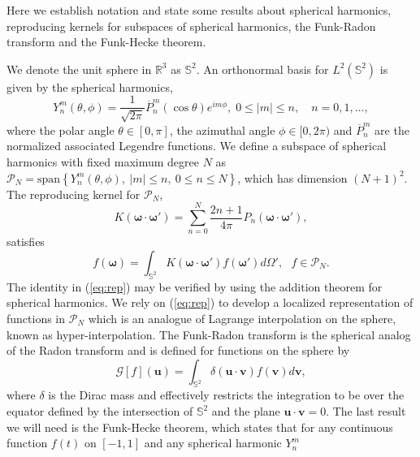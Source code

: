 \documentclass[landscape,a0b,final]{a0poster}
\newcommand{\HH}{{\mathcal P}}
\newcommand{\bomega}{{\boldsymbol{\omega}}}
\newcommand{\odotop}{{\boldsymbol{\omega}\cdot\boldsymbol{\omega}'}}
\newenvironment{poster}{
  \begin{center}
  \begin{minipage}[c]{0.98\textwidth}
}{
  \end{minipage} 
  \end{center}
}
\begin{document}
\begin{poster}
\begin{multicols}{3}
Here we establish notation and state some results about spherical harmonics, reproducing kernels for subspaces of spherical harmonics, the Funk-Radon transform and the Funk-Hecke theorem.

We denote the unit sphere in $\mathbb{R}^{3}$ as $\mathbb{S}^{2}$. An orthonormal basis for $L^{2}\left(\mathbb{S}^{2}\right)$ is given by the spherical harmonics, 
\begin{equation}
  Y_{n}^{m}\left(\theta,\phi\right)=\frac{1}{\sqrt{2\pi}}\overline{P}_{n}^{m}\left(\cos\theta\right)e^{im\phi},\;0\le|m|\le n,\quad n=0,1,\dots,
  \label{eq:ylm}
\end{equation}
%
where the polar angle $\theta\in[0,\pi]$, the azimuthal angle $\phi\in[0,2\pi)$
and $\overline{P}_{n}^{m}$ are the normalized associated Legendre functions. We define a subspace of spherical harmonics with fixed maximum degree $N$ as $\HH_{N}=\mathrm{span}\left\{ Y_{n}^{m}\left(\theta,\phi\right),\:|m|\le n,\:0\le n\le N\right\}$, which has dimension $\left(N+1\right)^{2}$. The reproducing kernel for $\HH_{N}$, 
%
\begin{equation}
  K\left(\bomega\cdot\bomega'\right) = \sum_{n=0}^{N}\frac{2n+1}{4\pi}P_{n}\left(\odotop\right),
  \label{eq:kernel}
\end{equation}
%
satisfies 
%
\begin{equation}
  f\left(\bomega\right)=\int_{\mathbb{S}^{2}}K\left(\odotop\right)f\left(\bomega'\right)d\Omega',\,\,\,\, f\in\HH_{N}.         
  \label{eq:rep}
\end{equation}
%
The identity in (\ref{eq:rep}) may be verified by using the addition theorem for spherical harmonics.
We rely on (\ref{eq:rep}) to develop a localized representation of functions
in $\HH_{N}$ which is an analogue of Lagrange interpolation on the sphere, known as hyper-interpolation.
%
The Funk-Radon transform is the spherical analog of the Radon transform and is defined for functions on the sphere by
%
\begin{equation}
  \mathcal{G}\left[f\right]\left(\mathbf{u}\right)=\int_{\mathbb{S}^{2}} \delta\left(\mathbf{u}\cdot\mathbf{v}\right)f\left(\mathbf{v}\right)d\mathbf{v},         
  \label{eq:funk-radon}
\end{equation}
%
where $\delta$ is the Dirac mass and effectively restricts the integration to be over the equator defined by the intersection of $\mathbb{S}^2$ and the plane $\mathbf{u}\cdot\mathbf{v} = 0$. The last result we will need is the Funk-Hecke theorem, which states that for any continuous function $f\left(t\right)$ on $\left[-1,1\right]$ and any spherical harmonic $Y_n^m$

\end{multicols}
\end{poster}
\end{document}
